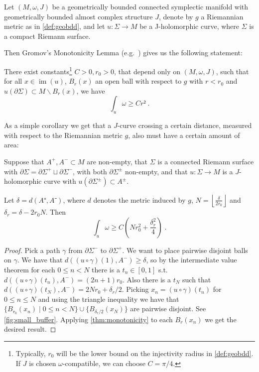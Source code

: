 \documentclass[12pt,a4paper,abstract=true,final]{scrartcl}
\DeclareMathOperator{\im}{im}
\begin{document}
Let $(M,ω,J)$ be a geometrically bounded connected symplectic manifold with geometrically bounded almost complex structure $J$, denote by $g$ a Riemannian metric as in \cref{def:geobdd}, and let $u\colon Σ → M$ be a J-holomorphic curve, where $Σ$ is a compact Riemann surface.

Then Gromov's Monotonicity Lemma (e.g.\ \cite[Proposition 4.3.1 (ii)]{sikorav1994}) gives us the following statement:

\begin{lemma}[Monotonicity]
  \label{thm:monotonicity}
  There exist constants\footnote{Typically, $r_0$ will be the lower bound on the injectivity radius in \cref{def:geobdd}.
If $J$ is chosen $ω$-compatible, we can choose $C=π/4$.} $C>0, r_0>0$, that depend only on $(M,ω,J)$, such that for all $x ∈ \im(u)$, $B_r(x)$ an open ball with respect to $g$ with $r<r_0$ and $u(∂Σ) ⊂ M ∖ B_r(x)$, we have
  \[∫_u ω ≥ C r² \; .\]
\end{lemma}

As a simple corollary we get that a $J$-curve crossing a certain distance, measured with respect to the Riemannian metric $g$, also must have a certain amount of area:

\begin{corollary}
  \label{thm:small_buffer}
  Suppose that $A^+, A^- ⊂ M$ are non-empty, that $Σ$ is a connected Riemann surface with $∂Σ = ∂Σ^+ ⊔ ∂Σ^-$, with both $∂Σ^±$ non-empty, and that $u\colon Σ → M$ is a $J$-holomorphic curve with $u(∂Σ^±) ⊂ A^±$.
  
  Let $δ=d(A⁺,A⁻)$, where $d$ denotes the metric induced by $g$, $N=\left\lfloor \frac{δ}{2r_0} \right\rfloor$ and $δ_r = δ-2r_0 N$.
  Then
  \[∫_u ω ≥ C(Nr_0^2+\frac{δ_r^2}{4}) \; .\]
\end{corollary}

\begin{proof}
  Pick a path $γ$ from $∂Σ^-$ to $∂Σ^+$.
  We want to place pairwise disjoint balls on $γ$.
  We have that $d((u ∘ γ) (1),A^-) ≥ δ$, so by the intermediate value theorem for each $0 ≤ n < N$ there is a $t_n ∈ [0,1]$ s.t.\ $d((u ∘ γ) (t_n),A^-) = (2n+1)r_0$.
  Also there is a $t_N$ such that $d((u ∘ γ) (t_N),A^-) = 2Nr_0 + δ_r/2$.
  Picking $x_n = (u ∘ γ)(t_n)$ for $0 ≤ n ≤ N$ and using the triangle inequality we have that $\{B_{r_0}(x_n) \mid 0 ≤ n < N\} \cup \{B_{δ_r/2}(x_N)\}$ are pairwise disjoint.
  See \cref{fig:small_buffer}.
  Applying \cref{thm:monotonicity} to each $B_r(x_n)$ we get the desired result.
\end{proof}
\end{document}
